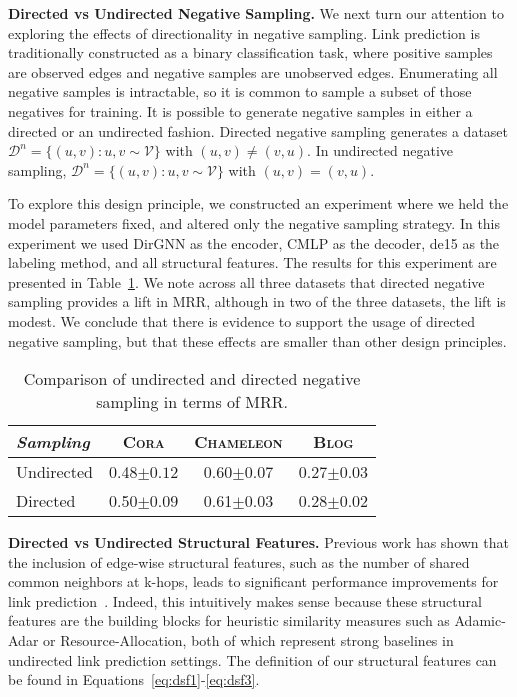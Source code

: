 \documentclass{article}
\begin{document}
\textbf{Directed vs Undirected Negative Sampling.} We next turn our attention to exploring the effects of directionality in negative sampling. Link prediction is traditionally constructed as a binary classification task, where positive samples are observed edges and negative samples are unobserved edges. Enumerating all negative samples is intractable, so it is common to sample a subset of those negatives for training. It is possible to generate negative samples in either a directed or an undirected fashion. Directed negative sampling generates a dataset $\mathcal{D}^n = \{ (u, v): u, v \sim \mathcal{V} \}$ with $(u, v) \neq (v, u)$. In undirected negative sampling, $\mathcal{D}^n = \{ (u, v): u, v \sim \mathcal{V} \}$ with $(u, v) = (v, u)$. 

To explore this design principle, we constructed an experiment where we held the model parameters fixed, and altered only the negative sampling strategy. In this experiment we used DirGNN as the encoder, CMLP as the decoder, de15 as the labeling method, and all structural features. The results for this experiment are presented in Table~\ref{t:ablation_sampling}. We note across all three datasets that directed negative sampling provides a lift in MRR, although in two of the three datasets, the lift is modest. We conclude that there is evidence to support the usage of directed negative sampling, but that these effects are smaller than other design principles.

\begin{table}[h]
\caption{Comparison of undirected and directed negative sampling in terms of MRR.}
\centering
\begin{tabular}{l c c c}
\textit{Sampling}  & \textsc{Cora}  & \textsc{Chameleon} & \textsc{Blog} \\
\hline
Undirected              & 0.48${\scriptstyle\pm0.12}$ & 0.60${\scriptstyle\pm0.07}$ &  0.27${\scriptstyle\pm0.03}$ \\
Directed                & \textcolor{junscolor1}{0.50${\scriptstyle\pm0.09}$} & \textcolor{junscolor1}{0.61${\scriptstyle\pm0.03}$} & \textcolor{junscolor1}{0.28${\scriptstyle\pm0.02}$} \\
\end{tabular}
\label{t:ablation_sampling}
\end{table}

\textbf{Directed vs Undirected Structural Features.} Previous work has shown that the inclusion of edge-wise structural features, such as the number of shared common neighbors at k-hops, leads to significant performance improvements for link prediction~\citep{zhang2024learning, ai2022structure, zhang2018link}. Indeed, this intuitively makes sense because these structural features are the building blocks for heuristic similarity measures such as Adamic-Adar or Resource-Allocation, both of which represent strong baselines in undirected link prediction settings. The definition of our structural features can be found in Equations~\ref{eq:dsf1}-\ref{eq:dsf3}.
\end{document}
